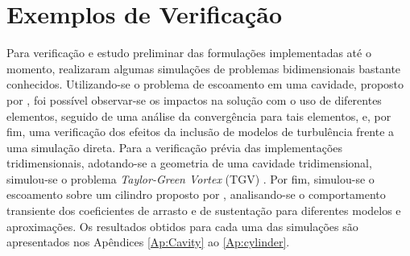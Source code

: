\section{Exemplos de Verificação} \label{ExemplosMT}

Para verificação e estudo preliminar das formulações implementadas até o momento, realizaram algumas simulações de problemas bidimensionais bastante conhecidos. Utilizando-se o problema de escoamento em uma cavidade, proposto por , foi possível observar-se os impactos na solução com o uso de diferentes elementos, seguido de uma análise da convergência para tais elementos, e, por fim, uma verificação dos efeitos da inclusão de modelos de turbulência frente a uma simulação direta. Para a verificação prévia das implementações tridimensionais, adotando-se a geometria de uma cavidade tridimensional, simulou-se o problema \textit{Taylor-Green Vortex} (TGV) \cite{shapiro1993use}. Por fim, simulou-se o escoamento sobre um cilindro proposto por , analisando-se o comportamento transiente dos coeficientes de arrasto e de sustentação para diferentes modelos e aproximações. Os resultados obtidos para cada uma das simulações são apresentados nos Apêndices \ref{Ap:Cavity} ao \ref{Ap:cylinder}.